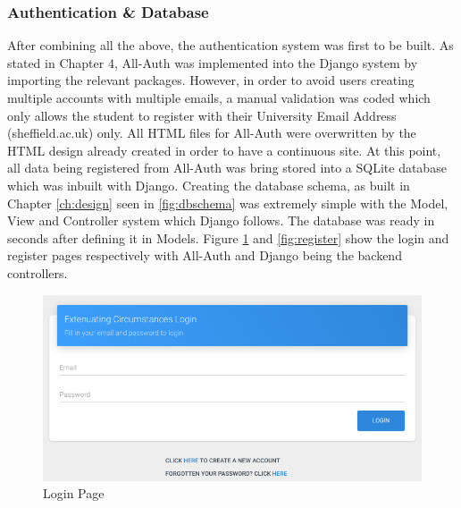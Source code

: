 \documentclass[../main.tex]{subfiles}
\begin{document}
\subsubsection{Authentication \& Database}
After combining all the above, the authentication system was first to be built. As stated in Chapter 4, All-Auth\cite{allauth} was implemented into the Django system by importing the relevant packages. However, in order to avoid users creating multiple accounts with multiple emails, a manual validation was coded which only allows the student to register with their University Email Address (sheffield.ac.uk) only. All HTML files for All-Auth were overwritten by the HTML design already created in order to have a continuous site. At this point, all data being registered from All-Auth was bring stored into a SQLite database which was inbuilt with Django. Creating the database schema, as built in Chapter \ref{ch:design} seen in \ref{fig:dbschema} was extremely simple with the Model, View and Controller system which Django follows. The database was ready in seconds after defining it in Models. Figure \ref{fig:login} and \ref{fig:register} show the login and register pages respectively with All-Auth and Django being the backend controllers. 


 \begin{figure}[H]
 	\begin{center}
        \includegraphics[scale=1]
        {images/login.png}
        \caption{\label{fig:login} Login Page}
     \end{center} 
      \end{figure} 
\end{document}
